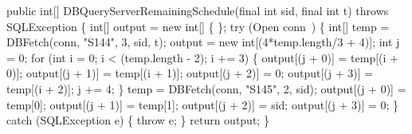 \documentclass{article}
\def\nwendcode{\endtrivlist \endgroup}      %
\let\nwdocspar=\par
\theoremstyle{definition}                   %
\begin{document}
\nwenddocs{}\endmoddef{}
public int[] DBQueryServerRemainingSchedule(final int sid, final int t)
throws SQLException \{
  int[] output = new int[] \{ \};
  try (\LA{}Open \code{}conn\edoc{}~{\nwtagstyle{}}\RA{}) \{
    int[] temp = DBFetch(conn, "S144", 3, sid, t);
    output = new int[(4*temp.length/3 + 4)];
    int j = 0;
    for (int i = 0; i < (temp.length - 2); i += 3) \{
      output[(j + 0)] = temp[(i + 0)];
      output[(j + 1)] = temp[(i + 1)];
      output[(j + 2)] = 0;
      output[(j + 3)] = temp[(i + 2)];
      j += 4;
    \}
    temp = DBFetch(conn, "S145", 2, sid);
    output[(j + 0)] = temp[0];
    output[(j + 1)] = temp[1];
    output[(j + 2)] = sid;
    output[(j + 3)] = 0;
  \} catch (SQLException e) \{
    throw e;
  \}
  return output;
\}
\eatline
{}\nwendcode{}\nwdocspar
\end{document}
